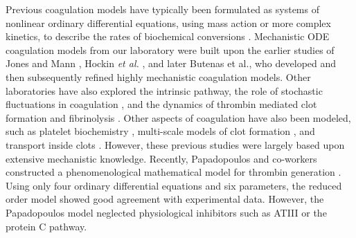 \documentclass[12pt]{article}
\begin{document}
Previous coagulation models have typically been formulated as systems of nonlinear ordinary differential equations,
using mass action or more complex kinetics, to describe the rates of biochemical conversions \citep{Khanin:1989aa,Willems:1991aa,Baldwin:1994aa,Leipold:1995aa,Kuharsky:2001aa}.
Mechanistic ODE coagulation models from our laboratory \citep{Luan:2007aa,Luan:2010aa}
were built upon the earlier studies of Jones and Mann \citep{Jones:1994aa}, Hockin \emph{et al.} \citep{Hockin:2002aa}, and later Butenas et al., \citep{Butenas:2004aa}
who developed and then subsequently refined highly mechanistic coagulation models.
Other laboratories have also explored the intrinsic pathway, the role of stochastic fluctuations in coagulation \citep{Lo:2005aa},
and the dynamics of thrombin mediated clot formation \citep{Chatterjee:2010aa} and fibrinolysis \citep{Mitrophanov:2014aa}.
Other aspects of coagulation have also been modeled, such as platelet biochemistry \citep{Stalker:2013aa},
multi-scale models of clot formation \citep{Leiderman:2014aa, Bannish:2014ab}, and transport inside clots \citep{Voronov:2013aa}.
However, these previous studies were largely based upon extensive mechanistic knowledge.
Recently, Papadopoulos and co-workers constructed a phenomenological mathematical model for thrombin generation \citep{Atkin:2014}.
Using only four ordinary differential equations and six parameters, the reduced order model showed good agreement with experimental data.
However, the Papadopoulos model neglected physiological inhibitors such as ATIII or the protein C pathway.
\end{document}
